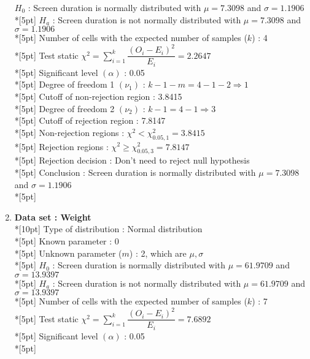 \begin{enumerate}
        $H_0$ : Screen duration is normally distributed with $\mu=7.3098$ and $\sigma=1.1906$\\*[5pt]
        $H_a$ : Screen duration is not normally distributed with $\mu=7.3098$ and $\sigma=1.1906$\\*[5pt]
        Number of cells with the expected number of samples ($k$) : 4\\*[5pt]
        Test static \(\chi^2=\displaystyle\sum\limits^k_{i=1}\dfrac{\left(O_i-E_i\right)^2}{E_i}=2.2647\)\\*[5pt]
        Significant level \(\left(\alpha\right)\) : 0.05\\*[5pt]
        Degree of freedom 1 \((\nu_1)\) : $k - 1 - m = 4 - 1 - 2 \Rightarrow 1$\\*[5pt]
        Cutoff of non-rejection region : 3.8415\\*[5pt]
        Degree of freedom 2 \((\nu_2)\) : $k - 1 = 4 - 1 \Rightarrow 3$\\*[5pt]
        Cutoff of rejection region : 7.8147\\*[5pt]
        Non-rejection regions : \(\chi^2 < \chi^2_{0.05, 1}=3.8415\)\\*[5pt]
        Rejection regions : \(\chi^2 \geq \chi^2_{0.05, 3}=7.8147\)\\*[5pt]
        Rejection decision : Don't need to reject null hypothesis\\*[5pt]
        Conclusion : Screen duration is normally distributed with $\mu=7.3098$ and $\sigma=1.1906$\\*[5pt]
    \item \textbf{Data set : Weight}\\*[10pt]
        Type of distribution : Normal distribution\\*[5pt]
        Known parameter : 0\\*[5pt]
        Unknown parameter ($m$) : 2, which are \(\mu, \sigma\)\\*[5pt]
        $H_0$ : Screen duration is normally distributed with $\mu=61.9709$ and $\sigma=13.9397$\\*[5pt]
        $H_a$ : Screen duration is not normally distributed with $\mu=61.9709$ and $\sigma=13.9397$\\*[5pt]
        Number of cells with the expected number of samples ($k$) : 7\\*[5pt]
        Test static \(\chi^2=\displaystyle\sum\limits^k_{i=1}\dfrac{\left(O_i-E_i\right)^2}{E_i}=7.6892\)\\*[5pt]
        Significant level \(\left(\alpha\right)\) : 0.05\\*[5pt]

\end{enumerate}
